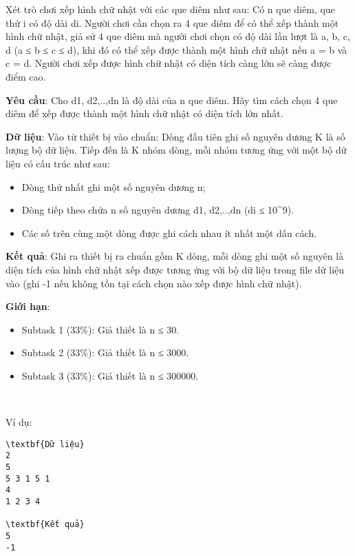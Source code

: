 

Xét trò chơi xếp hình chữ nhật với các que diêm như sau: Có n que diêm, que thứ i có độ dài di. Người chơi cần chọn ra 4 que diêm để có thể xếp thành một hình chữ nhật, giả sử 4 que diêm mà người chơi chọn có độ dài lần lượt là a, b, c, d (a ≤ b ≤ c ≤ d), khi đó có thể xếp được thành một hình chữ nhật nếu a = b và c = d. Người chơi xếp được hình chữ nhật có diện tích càng lớn sẽ càng được điểm cao.

\textbf{Yêu cầu}: Cho d1, d2,..,dn là độ dài của n que diêm. Hãy tìm cách chọn 4 que diêm để xếp được thành một hình chữ nhật có diện tích lớn nhất.

\textbf{Dữ liệu}: Vào từ thiết bị vào chuẩn: Dòng đầu tiên ghi số nguyên dương K là số lượng bộ dữ liệu. Tiếp đến là K nhóm dòng, mỗi nhóm tương ứng với một bộ dữ liệu có cấu trúc như sau:
\begin{itemize}
	\item Dòng thứ nhất ghi một số nguyên dương n;
	\item Dòng tiếp theo chứa n số nguyên dương d1, d2,..,dn (di ≤ 10^9).
	\item Các số trên cùng một dòng được ghi cách nhau ít nhất một dấu cách.
\end{itemize}

\textbf{Kết quả}: Ghi ra thiết bị ra chuẩn gồm K dòng, mỗi dòng ghi một số nguyên là diện tích của hình chữ nhật xếp được tương ứng với bộ dữ liệu trong file dữ liệu vào (ghi -1 nếu không tồn tại cách chọn nào xếp được hình chữ nhật).

\textbf{Giới hạn}:
\begin{itemize}
	\item Subtask 1 (33\%): Giả thiết là n ≤ 30.
	\item Subtask 2 (33\%): Giả thiết là n ≤ 3000.
	\item Subtask 3 (33\%): Giả thiết là n ≤ 300000.
\end{itemize}

 

Ví dụ:
\begin{verbatim}
\textbf{Dữ liệu}
2
5
5 3 1 5 1
4
1 2 3 4

\textbf{Kết quả}
5
-1\end{verbatim}

 
